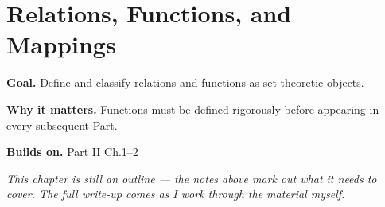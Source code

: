 \chapter{Relations, Functions, and Mappings}
\label{ch:02-set-theory-03}

\begin{chapterintro}
\textbf{Goal.} Define and classify relations and functions as set-theoretic objects.

\textbf{Why it matters.} Functions must be defined rigorously before appearing in every subsequent Part.

\textbf{Builds on.} Part II Ch.1–2
\end{chapterintro}

\textit{This chapter is still an outline --- the notes above mark out what it needs to cover. The full write-up comes as I work through the material myself.}
